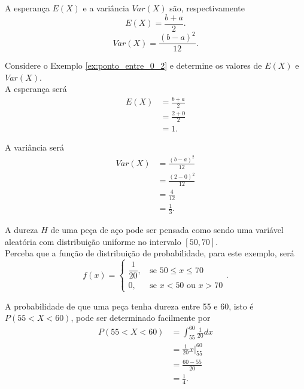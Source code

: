 A esperança $E(X)$ e a variância $Var(X)$ são, respectivamente
\begin{equation}
	E(X)=\frac{b+a}{2}
	\text{.}
\end{equation}
\begin{equation}
	Var(X)=\frac{(b-a)^2}{12}
	\text{.}
\end{equation}

\begin{example}
	Considere o Exemplo \ref{ex:ponto_entre_0_2} e determine os valores de $E(X)$ e $Var(X)$.\\
			
	A esperança será
		\begin{align*}
			E(X)&=\frac{b+a}{2}\\
				&=\frac{2+0}{2}\\
				&=1\text{.}
		\end{align*}
		
	A variância será
		\begin{align*}
			Var(X)&=\frac{(b-a)^2}{12}\\
				  &=\frac{(2-0)^2}{12}\\
				  &=\frac{4}{12}\\
				  &=\frac{1}{3}\text{.}
		\end{align*}
\end{example}

\begin{example}
	A dureza $H$ de uma peça de aço pode ser pensada como sendo uma variável aleatória com distribuição uniforme no intervalo $[50, 70]$. \\
	
	Perceba que a função de distribuição de probabilidade, para este exemplo, será
	\[
		f(x)=\begin{cases}
			\dfrac{1}{20}\text{,}&\text{ se } 50\leqslant x\leqslant 70\\
			0\text{,}&\text{ se } x<50\text{ ou }x>70
		\end{cases}\text{.}
	\]
	
	A probabilidade de que uma peça tenha dureza entre 55 e 60, isto é $P(55<X<60)$, pode ser determinado facilmente por
	\begin{align*}
		P(55<X<60)&=\int_{55}^{60} \frac{1}{20}dx\\
				  &=\frac{1}{20}x\Big|_{55}^{60}\\
				  &=\frac{60-55}{20}\\
				  &=\frac{1}{4}\text{.}
	\end{align*}
\end{example}

